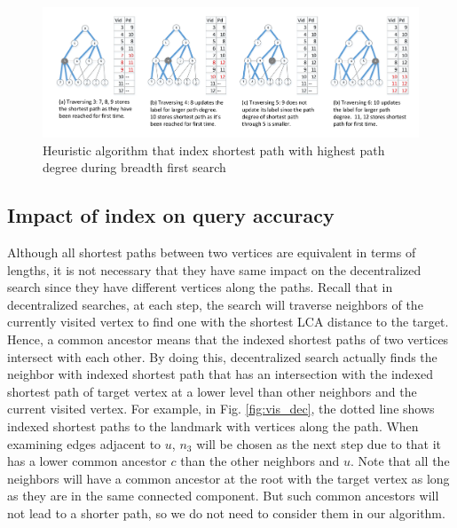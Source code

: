\begin{figure}[htbp]
    \centering
    \includegraphics[width=\linewidth]{../figures/new_illustrate/bfs_illustrate.pdf}
    \caption{Heuristic algorithm that index shortest path with highest path degree during breadth first search}
    \label{fig:bfs_illustrate}
\end{figure}

\subsection{Impact of index on query accuracy}
Although all shortest paths between two vertices are equivalent in terms of lengths, it is not necessary that they have same impact on the decentralized search since they have different vertices along the paths. Recall that in decentralized searches, at each step, the search will traverse neighbors of the currently visited vertex to find one with the shortest LCA distance to the target. Hence, a common ancestor means that the indexed shortest paths of two vertices intersect with each other. By doing this, decentralized search actually finds the neighbor with indexed shortest path that has an intersection with the indexed shortest path of target vertex at a lower level than other neighbors and the current visited vertex. For example, in Fig. \ref{fig:vis_dec}, the dotted line shows indexed shortest paths to the landmark with vertices along the path. When examining edges adjacent to $u$, $n_3$ will be chosen as the next step due to that it has a lower common ancestor $c$ than the other neighbors and $u$. Note that all the neighbors will have a common ancestor at the root with the target vertex as long as they are in the same connected component. But such common ancestors will not lead to a shorter path, so we do not need to consider them in our algorithm.

